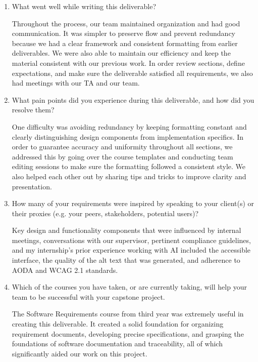 \begin{enumerate}
  \item What went well while writing this deliverable? 
  
  Throughout the process, our team maintained organization and had good communication.  It was simpler to preserve flow and prevent redundancy because we had a clear framework and consistent formatting from earlier deliverables.  We were also able to maintain our efficiency and keep the material consistent with our previous work.  In order review sections, define expectations, and make sure the deliverable satisfied all requirements, we also had meetings with our TA and our team.
  \item What pain points did you experience during this deliverable, and how did
  you resolve them?

  One difficulty was avoiding redundancy by keeping formatting constant and clearly distinguishing design components from implementation specifics. In order to guarantee accuracy and uniformity throughout all sections, we addressed this by going over the course templates and conducting team editing sessions to make sure the formatting followed a consistent style. We also helped each other out by sharing tips and tricks to improve clarity and presentation.

  \item How many of your requirements were inspired by speaking to your
  client(s) or their proxies (e.g. your peers, stakeholders, potential users)?
  
  Key design and functionality components that were influenced by internal meetings, conversations with our supervisor, pertinent compliance guidelines, and my internship's prior experience working with AI included the accessible interface, the quality of the alt text that was generated, and adherence to AODA and WCAG 2.1 standards.
  \item Which of the courses you have taken, or are currently taking, will help
  your team to be successful with your capstone project.

  The Software Requirements course from third year was extremely useful in creating this deliverable.  It created a solid foundation for organizing requirement documents, developing precise specifications, and grasping the foundations of software documentation and traceability, all of which significantly aided our work on this project.


\end{enumerate}

